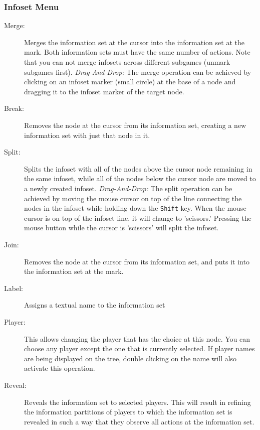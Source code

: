 {\subsubsection{Infoset Menu}
\begin{description}
\item[Merge:] Merges the information set at the cursor into the information set at 
the mark.  Both information sets must have the same number of actions.  Note
that you can not merge infosets across different subgames (unmark subgames first).
{\em Drag-And-Drop:} The merge operation can be achieved by clicking on an
infoset marker (small circle) at the base of a node and dragging it to the
infoset marker of the target node.  
\item[Break:] Removes the node at the cursor from its information set, creating a new 
information set with just that node in it. 
\item[Split:] Splits the infoset with all of the nodes above the cursor node
remaining in the same infoset, while all of the nodes below the cursor node
are moved to a newly created infoset.
{\em Drag-And-Drop:} The split operation can be achieved by moving the mouse
cursor on top of the line connecting the nodes in the infoset while holding
down the {\tt Shift} key.  When the mouse cursor is on top of the infoset
line, it will change to 'scissors.'  Pressing the mouse button while the cursor
is 'scissors' will split the infoset.
\item[Join:] Removes the node at the cursor from its information set, and puts it into 
the information set at the mark.  
\item[Label:] Assigns a textual name to the information set
\item[Player:]  This allows changing the player that has the choice
at this node.  You can choose any player except the one that is currently
selected.  If player names are being displayed on the tree, double clicking
on the name will also activate this operation.
\item[Reveal:] Reveals the information set to selected players.  This will 
result in refining the information partitions of players to which the information set 
is revealed in such a way that they observe all actions at the information set.  
\end{description}

}
